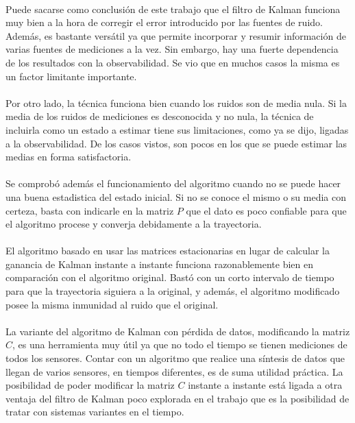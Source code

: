 
	\paragraph{}
	Puede sacarse como conclusión de este trabajo que el filtro de Kalman funciona muy bien a la hora de corregir el error introducido por las fuentes de ruido. Además, es bastante versátil ya que permite incorporar y resumir información de varias fuentes de mediciones a la vez. Sin embargo, hay una fuerte dependencia de los resultados con la observabilidad. Se vio que en muchos casos la misma es un factor limitante importante.
	
	\paragraph{}
	Por otro lado, la técnica funciona bien cuando los ruidos son de media nula. Si la media de los ruidos de mediciones es desconocida y no nula, la técnica de incluirla como un estado a estimar tiene sus limitaciones, como ya se dijo, ligadas a la observabilidad. De los casos vistos, son pocos en los que se puede estimar las medias en forma satisfactoria.
	
	\paragraph{}
	Se comprobó además el funcionamiento del algoritmo cuando no se puede hacer una buena estadistica del estado inicial. Si no se conoce el mismo o su media con certeza, basta con indicarle en la matriz $P$ que el dato es poco confiable para que el algoritmo procese y converja debidamente a la trayectoria.
	
	\paragraph{}
	El algoritmo basado en usar las matrices estacionarias en lugar de calcular la ganancia de Kalman instante a instante funciona razonablemente bien en comparación con el algoritmo original. Bastó con un corto intervalo de tiempo para que la trayectoria siguiera a la original, y además, el algoritmo modificado posee la misma inmunidad al ruido que el original.
	
	\paragraph{}
	La variante del algoritmo de Kalman con pérdida de datos, modificando la matriz $C$, es una herramienta muy útil ya que no todo el tiempo se tienen mediciones de todos los sensores. Contar con un algoritmo que realice una síntesis de datos que llegan de varios sensores, en tiempos diferentes, es de suma utilidad práctica. La posibilidad de poder modificar la matriz $C$ instante a instante está ligada a otra ventaja del filtro de Kalman poco explorada en el trabajo que es la posibilidad de tratar con sistemas variantes en el tiempo.
	

